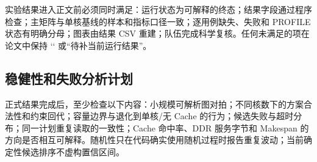 实验结果进入正文前必须同时满足：运行状态为可解释的终态；结果字段通过程序检查；主矩阵与单核基线的样本和指标口径一致；逐用例缺失、失败和 PROFILE 状态有明确分母；图表由结果 CSV 重建；队伍完成科学复核。任何未满足的项在论文中保持 `\pending` 或“待补当前运行结果”。

\subsection{稳健性和失败分析计划}
正式结果完成后，至少检查以下内容：小规模可解析图对拍；不同核数下的方案合法性和约束回代；容量边界与退化到单核/无 Cache 的行为；候选失败与超时分布；同一计划重复读取的一致性；Cache 命中率、DDR 服务字节和 Makespan 的方向是否相互可解释。随机性只在代码确实使用随机过程时报告重复波动；当前确定性候选排序不虚构置信区间。
